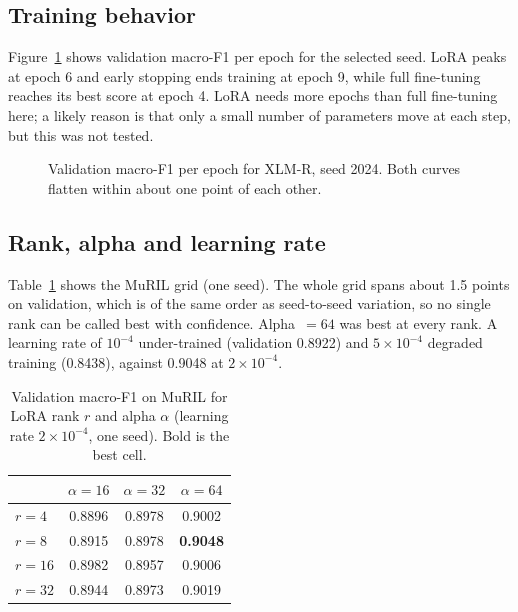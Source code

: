 \documentclass[conference]{IEEEtran}
\begin{document}
\subsection{Training behavior}
Figure~\ref{fig:curve} shows validation macro-F1 per epoch for the selected seed. LoRA peaks at epoch 6 and early stopping ends training at epoch 9, while full fine-tuning reaches its best score at epoch 4. LoRA needs more epochs than full fine-tuning here; a likely reason is that only a small number of parameters move at each step, but this was not tested.

\begin{figure}[t]
\centering
{}
\caption{Validation macro-F1 per epoch for XLM-R, seed 2024. Both curves flatten within about one point of each other.}
\label{fig:curve}
\end{figure}

\subsection{Rank, alpha and learning rate}
Table~\ref{tab:grid} shows the MuRIL grid (one seed). The whole grid spans about 1.5 points on validation, which is of the same order as seed-to-seed variation, so no single rank can be called best with confidence. Alpha~$=64$ was best at every rank. A learning rate of $10^{-4}$ under-trained (validation 0.8922) and $5\times10^{-4}$ degraded training (0.8438), against 0.9048 at $2\times10^{-4}$.

\begin{table}[t]
\caption{Validation macro-F1 on MuRIL for LoRA rank $r$ and alpha $\alpha$ (learning rate $2\times10^{-4}$, one seed). Bold is the best cell.}
\label{tab:grid}
\centering
\footnotesize
\begin{tabular}{lccc}
\toprule
 & $\alpha=16$ & $\alpha=32$ & $\alpha=64$ \\
\midrule
$r=4$ & 0.8896 & 0.8978 & 0.9002 \\
$r=8$ & 0.8915 & 0.8978 & \textbf{0.9048} \\
$r=16$ & 0.8982 & 0.8957 & 0.9006 \\
$r=32$ & 0.8944 & 0.8973 & 0.9019 \\
\bottomrule
\end{tabular}
\end{table}
\end{document}
